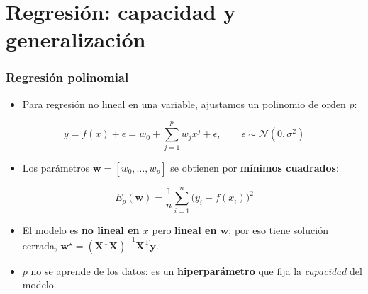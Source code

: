 \documentclass[aspectratio=169, 10pt]{beamer}
\newcommand{\formula}[1]{%
	\begin{tcolorbox}[colback=UCMBlue!8, colframe=UCMBlue, arc=4pt,
		boxsep=2pt, left=6pt, right=6pt, top=3pt, bottom=3pt]
		#1
	\end{tcolorbox}
}
\begin{document}
\section{Regresión: capacidad y generalización}

\begin{frame}
\frametitle{Regresión polinomial}
\begin{itemize}
	\item Para regresi\'on no lineal en una variable, ajustamos un polinomio de orden $p$:
\end{itemize}
\formula{
\[
y = f(x) + \epsilon = w_0 + \sum_{j=1}^{p} w_j x^{j} + \epsilon,
\qquad \epsilon \sim \mathcal{N}(0,\sigma^2)
\]}
\pause
\begin{itemize}
	\item Los par\'ametros $\mathbf w = [w_0,\ldots,w_p]$ se obtienen por \textbf{m\'inimos cuadrados}:
\end{itemize}
\formula{
\[
E_p(\mathbf w) = \frac{1}{n}\sum_{i=1}^{n}\big(y_i - f(x_i)\big)^{2}
\]}
\pause
\begin{itemize}
	\item El modelo es \textbf{no lineal en $x$} pero \textbf{lineal en $\mathbf w$}: por eso tiene soluci\'on cerrada, $\mathbf w^\star = (\mathbf X^{\mathrm{T}}\mathbf X)^{-1}\mathbf X^{\mathrm{T}}\mathbf y$.
	\item $p$ no se aprende de los datos: es un \textbf{hiperpar\'ametro} que fija la \emph{capacidad} del modelo.
\end{itemize}
\end{frame}
\end{document}
